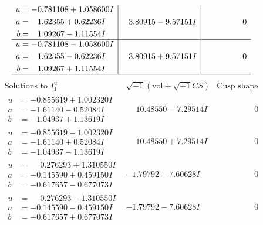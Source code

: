 \documentclass[1p]{elsarticle_modified}
\theoremstyle{definition}
\newcommand{\I}{\sqrt{-1}}
\begin{document}
$$\begin{array}{c|c|c}
\begin{aligned}
u &= -0.781108 + 1.058600 I \\
a &= \phantom{-}1.62355 + 0.62236 I \\
b &= \phantom{-}1.09267 - 1.11554 I\end{aligned}
 & \phantom{-}3.80915 - 9.57151 I & \phantom{-0.000000 } 0 \\ \hline\begin{aligned}
u &= -0.781108 - 1.058600 I \\
a &= \phantom{-}1.62355 - 0.62236 I \\
b &= \phantom{-}1.09267 + 1.11554 I\end{aligned}
 & \phantom{-}3.80915 + 9.57151 I & \phantom{-0.000000 } 0\\
 \hline 
 \end{array}$$\newpage$$\begin{array}{c|c|c}  
\text{Solutions to }I^u_{1}& \I (\text{vol} + \sqrt{-1}CS) & \text{Cusp shape}\\
 \hline 
\begin{aligned}
u &= -0.855619 + 1.002320 I \\
a &= -1.61140 - 0.52084 I \\
b &= -1.04937 + 1.13619 I\end{aligned}
 & \phantom{-}10.48550 - 7.29514 I & \phantom{-0.000000 } 0 \\ \hline\begin{aligned}
u &= -0.855619 - 1.002320 I \\
a &= -1.61140 + 0.52084 I \\
b &= -1.04937 - 1.13619 I\end{aligned}
 & \phantom{-}10.48550 + 7.29514 I & \phantom{-0.000000 } 0 \\ \hline\begin{aligned}
u &= \phantom{-}0.276293 + 1.310550 I \\
a &= -0.145590 + 0.459150 I \\
b &= -0.617657 - 0.677073 I\end{aligned}
 & -1.79792 + 7.60628 I & \phantom{-0.000000 } 0 \\ \hline\begin{aligned}
u &= \phantom{-}0.276293 - 1.310550 I \\
a &= -0.145590 - 0.459150 I \\
b &= -0.617657 + 0.677073 I\end{aligned}
 & -1.79792 - 7.60628 I & \phantom{-0.000000 } 0 \\ \hline\begin{aligned}

\end{aligned}
\end{array}$$
\end{document}
